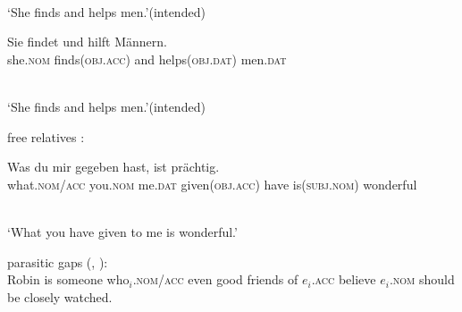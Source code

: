 \documentclass[output=paper]{langsci/langscibook}
\begin{document}
\begin{examples}
\begin{examples}
\begin{gloss}
    \end{gloss}\\[\glosslen]
    ‘She finds and helps men.’\hfill(intended)
  \item
    \begin{gloss}
      \prep{*}Sie findet und hilft Männern. \\
      she.\textsc{nom} finds(\textsc{obj.acc}) and helps(\textsc{obj.dat}) men.\textsc{dat}
    \end{gloss}\\[\glosslen]
    ‘She finds and helps men.’\hfill(intended)
  \end{examples}
\item\label{ex:syn:gfr}  free relatives \citep[212]{GR81}: \\ [1ex]
  \begin{gloss}
    Was du mir gegeben hast, ist prächtig. \\
    what.\textsc{nom/acc} you.\textsc{nom} me.\textsc{dat} given(\textsc{obj.acc}) have is(\textsc{subj.nom}) wonderful
  \end{gloss} \\[\glosslen]
  ‘What you have given to me is wonderful.’
\item\label{ex:syn:epg}  parasitic gaps (\citealt[482]{HL96a}, \citealt[205]{LHC2001a-u}): \\ [1ex]
  Robin is someone who$_i$.\textsc{nom/acc} even good friends of $e_i$.\textsc{acc} believe $e_i$.\textsc{nom} should be closely watched.
\end{examples}
\end{document}

